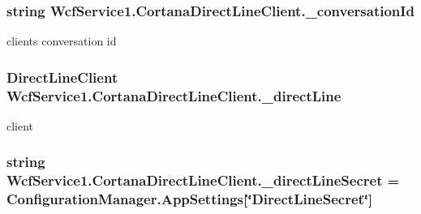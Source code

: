 \subsubsection[{\texorpdfstring{\+\_\+conversation\+Id}{_conversationId}}]{\setlength{\rightskip}{0pt plus 5cm}string Wcf\+Service1.\+Cortana\+Direct\+Line\+Client.\+\_\+conversation\+Id\hspace{0.3cm}{\ttfamily [private]}}\hypertarget{class_wcf_service1_1_1_cortana_direct_line_client_a460c7a68d595773d131142651fa2b213}{}\label{class_wcf_service1_1_1_cortana_direct_line_client_a460c7a68d595773d131142651fa2b213}


client\textquotesingle{}s conversation id 

\subsubsection[{\texorpdfstring{\+\_\+direct\+Line}{_directLine}}]{\setlength{\rightskip}{0pt plus 5cm}Direct\+Line\+Client Wcf\+Service1.\+Cortana\+Direct\+Line\+Client.\+\_\+direct\+Line\hspace{0.3cm}{\ttfamily [private]}}\hypertarget{class_wcf_service1_1_1_cortana_direct_line_client_a2161a12a94efe732c80a2f31f7a91d8d}{}\label{class_wcf_service1_1_1_cortana_direct_line_client_a2161a12a94efe732c80a2f31f7a91d8d}


client 

\subsubsection[{\texorpdfstring{\+\_\+direct\+Line\+Secret}{_directLineSecret}}]{\setlength{\rightskip}{0pt plus 5cm}string Wcf\+Service1.\+Cortana\+Direct\+Line\+Client.\+\_\+direct\+Line\+Secret = Configuration\+Manager.\+App\+Settings\mbox{[}\char`\"{}Direct\+Line\+Secret\char`\"{}\mbox{]}\hspace{0.3cm}{\ttfamily [private]}}\hypertarget{class_wcf_service1_1_1_cortana_direct_line_client_a06b449cbb20e2a97dc873b306371b577}{}\label{class_wcf_service1_1_1_cortana_direct_line_client_a06b449cbb20e2a97dc873b306371b577}


